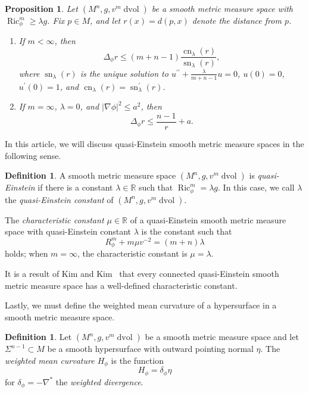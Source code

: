 \documentclass{amsart}
\newtheorem{prop}[thm]{Proposition}
\theoremstyle{definition}
\newtheorem{defn}[thm]{Definition}
\theoremstyle{remark}
\numberwithin{equation}{section}
\begin{document}
\begin{prop}
\label{prop:laplacian_comparison}
Let $(M^n,g,v^m\operatorname{dvol})$ be a smooth metric measure space with $\operatorname{Ric}_\phi^m\geq\lambda g$.  Fix $p\in M$, and let $r(x)=d(p,x)$ denote the distance from $p$.
\begin{enumerate}
\item If $m<\infty$, then
\[ \Delta_\phi r \leq (m+n-1)\frac{\operatorname{cn}_\lambda(r)}{\operatorname{sn}_\lambda(r)} , \]
where $\operatorname{sn}_\lambda(r)$ is the unique solution to $u^{\prime\prime}+\frac{\lambda}{m+n-1} u=0$, $u(0)=0$, $u^\prime(0)=1$, and $\operatorname{cn}_\lambda(r)=\operatorname{sn}_\lambda^\prime(r)$.
\item If $m=\infty$, $\lambda=0$, and ${\lvert}\nabla\phi{\rvert}^2\leq a^2$, then
\[ \Delta_\phi r \leq \frac{n-1}{r} + a . \]
\end{enumerate}
\end{prop}

In this article, we will discuss quasi-Einstein smooth metric measure spaces in the following sense.

\begin{defn}
A smooth metric measure space $(M^n,g,v^m\operatorname{dvol})$ is \emph{quasi-Einstein} if there is a constant $\lambda\in{\mathbb{R}}$ such that $\operatorname{Ric}_\phi^m=\lambda g$.  In this case, we call $\lambda$ the \emph{quasi-Einstein constant} of $(M^n,g,v^m\operatorname{dvol})$.

The \emph{characteristic constant $\mu\in{\mathbb{R}}$} of a quasi-Einstein smooth metric measure space with quasi-Einstein constant $\lambda$ is the constant such that
\begin{equation}
\label{eqn:charconst}
R_\phi^m + m\mu v^{-2} = (m+n)\lambda
\end{equation}
holds; when $m=\infty$, the characteristic constant is $\mu=\lambda$.
\end{defn}

It is a result of Kim and Kim~\cite{Kim_Kim} that every connected quasi-Einstein smooth metric measure space has a well-defined characteristic constant.

Lastly, we must define the weighted mean curvature of a hypersurface in a smooth metric measure space.

\begin{defn}
Let $(M^n,g,v^m\operatorname{dvol})$ be a smooth metric measure space and let $\Sigma^{n-1}\subset M$ be a smooth hypersurface with outward pointing normal $\eta$.  The \emph{weighted mean curvature $H_\phi$} is the function
\[ H_\phi = \delta_\phi\eta \]
for $\delta_\phi=-\nabla^\ast$ the \emph{weighted divergence}.
\end{defn}
\end{document}
